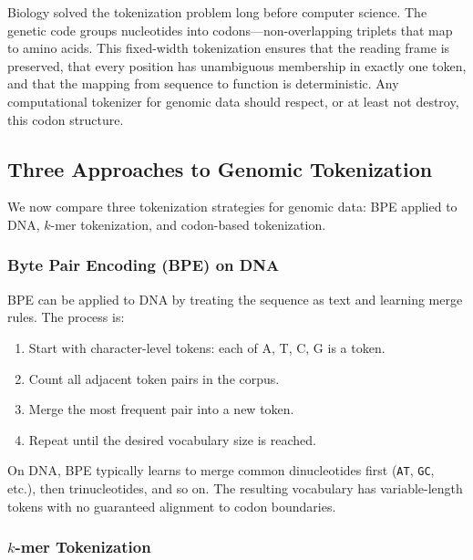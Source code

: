 \begin{bioinsight}
Biology solved the tokenization problem long before computer science. The genetic code groups nucleotides into codons---non-overlapping triplets that map to amino acids. This fixed-width tokenization ensures that the reading frame is preserved, that every position has unambiguous membership in exactly one token, and that the mapping from sequence to function is deterministic. Any computational tokenizer for genomic data should respect, or at least not destroy, this codon structure.
\end{bioinsight}

\subsection{Three Approaches to Genomic Tokenization}
\label{sec:three-tokenization}

We now compare three tokenization strategies for genomic data: BPE applied to DNA, $k$-mer tokenization, and codon-based tokenization.

\subsubsection{Byte Pair Encoding (BPE) on DNA}

BPE can be applied to DNA by treating the sequence as text and learning merge rules. The process is:

\begin{enumerate}[leftmargin=1.5em]
  \item Start with character-level tokens: each of A, T, C, G is a token.
  \item Count all adjacent token pairs in the corpus.
  \item Merge the most frequent pair into a new token.
  \item Repeat until the desired vocabulary size is reached.
\end{enumerate}

On DNA, BPE typically learns to merge common dinucleotides first (\texttt{AT}, \texttt{GC}, etc.), then trinucleotides, and so on. The resulting vocabulary has variable-length tokens with no guaranteed alignment to codon boundaries.

\subsubsection{$k$-mer Tokenization}

